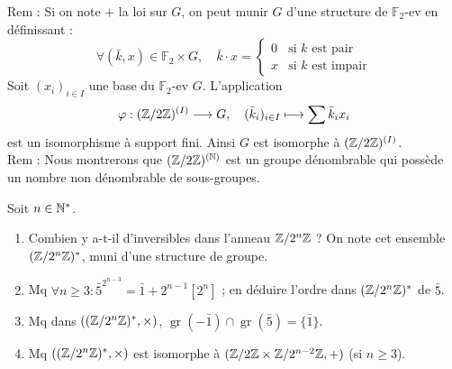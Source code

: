 \begin{solution}
\begin{remarkbox}
Rem : Si on note $+$ la loi sur $G$, on peut munir $G$ d'une structure de $\mathbb{F}_2$-ev en définissant :
\[ \forall (\bar{k}, x) \in \mathbb{F}_2 \times G, \quad \bar{k} \cdot x = \begin{cases} 0 & \text{si } k \text{ est pair} \\ x & \text{si } k \text{ est impair} \end{cases} \]
Soit $(x_i)_{i \in I}$ une base du $\mathbb{F}_2$-ev $G$. L'application
\[ \varphi : (\mathbb Z/2\mathbb Z)^{(I)} \longrightarrow G, \quad (\bar{k}_i)_{i \in I} \longmapsto \sum \bar{k}_i x_i \]
est un isomorphisme à support fini. Ainsi $G$ est isomorphe à $(\mathbb Z/2\mathbb Z)^{(I)}$. \\
Rem : Nous montrerons que $(\mathbb Z/2\mathbb Z)^{(\mathbb N)}$ est un groupe dénombrable qui possède un nombre non dénombrable de sous-groupes.
\end{remarkbox}
\end{solution}


\begin{statementbox}
Soit $n \in \mathbb N^*$.
\begin{enumerate}[label=\alph*)]
  \item Combien y a-t-il d'inversibles dans l'anneau $\mathbb Z/2^n\mathbb Z$ ?
  On note cet ensemble $(\mathbb Z/2^n\mathbb Z)^*$, muni d'une structure de groupe.
  \item Mq $\forall n \geq 3 : \bar{5}^{2^{n-3}} = \bar{1} + 2^{n-1} [2^n]$ ; en déduire l'ordre dans $(\mathbb Z/2^n\mathbb Z)^*$ de $\bar{5}$.
  \item Mq dans $((\mathbb Z/2^n\mathbb Z)^*, \times)$, $\operatorname{gr}(-\bar{1}) \cap \operatorname{gr}(\bar{5}) = \{\bar{1}\}$.
  \item Mq $((\mathbb Z/2^n\mathbb Z)^*, \times)$ est isomorphe à $(\mathbb Z/2\mathbb Z \times \mathbb Z/2^{n-2}\mathbb Z, +)$ (si $n \geq 3$).
\end{enumerate}
\end{statementbox}

